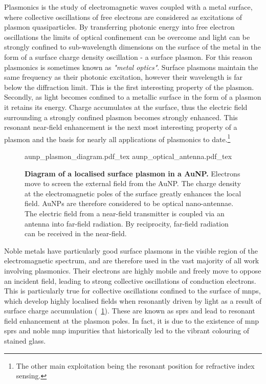 \documentclass[12pt, a4paper, twoside]{book}
\begin{document}
Plasmonics is the study of electromagnetic waves coupled with a metal surface, where collective oscillations of free electrons are considered as excitations of plasmon quasiparticles. By transferring photonic energy into free electron oscillations the limits of optical confinement can be overcome and light can be strongly confined to sub-wavelength dimensions on the surface of the metal in the form of a surface charge density oscillation - a surface plasmon. For this reason plasmonics is sometimes known as \textit{"metal optics"}.
Surface plasmons maintain the same frequency as their photonic excitation, however their wavelength is far below the diffraction limit. This is the first interesting property of the plasmon. Secondly, as light becomes confined to a metallic surface in the form of a plasmon {\color{red}it retains its energy.} Charge accumulates at the surface, thus the electric field surrounding a strongly confined plasmon becomes strongly enhanced. This resonant near-field enhancement is the next most interesting property of a plasmon and the basis for nearly all applications of plasmonics to date.\footnote{The other main exploitation being the resonant position for refractive index sensing.}

\begin{figure}[bt]
\centering
\fontsize{10pt}{1em}\selectfont
\def\svgwidth{0.6\textwidth}
{aunp_plasmon_diagram.pdf_tex}
\def\svgwidth{0.35\textwidth}
{aunp_optical_antenna.pdf_tex}
\caption[Diagram of a localised surface plasmon in a AuNP.]{\textbf{Diagram of a localised surface plasmon in a AuNP.} Electrons move to screen the external field from the AuNP. The charge density at the electromagnetic poles of the surface greatly enhances the local field. AuNPs are therefore considered to be optical nano-antennae. The electric field from a near-field transmitter is coupled via an antenna into far-field radiation. By reciprocity, far-field radiation can be received in the near-field.}
\label{fig:aunp_plasmon}
\end{figure}

Noble metals have particularly good surface plasmons in the visible region of the electromagnetic spectrum, and are therefore used in the vast majority of all work involving plasmonics. Their electrons are highly mobile and freely move to oppose an incident field, leading to strong collective oscillations of conduction electrons. This is particularly true for collective oscillations confined to the surface of \glspl{mnp}, which develop highly localised fields when resonantly driven by light as a result of surface charge accumulation (\figurename~\ref{fig:aunp_plasmon}). These are known as \glspl{spr} and lead to resonant field enhancement at the plasmon poles. In fact, it is due to the existence of \gls{mnp} \glspl{spr} and noble \gls{mnp} impurities that historically led to the vibrant colouring of stained glass.
\end{document}
